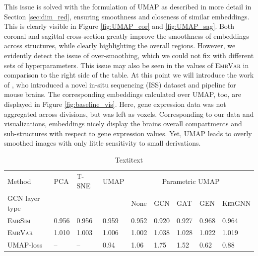 \documentclass[]{article}
\begin{document}
This issue is solved with the formulation of UMAP as described in more detail in Section \ref{sec:dim_red}, ensuring smoothness and closeness of similar embeddings. This is clearly visible in Figure \ref{fig:UMAP_cor} and \ref{fig:UMAP_sag}. Both coronal and sagittal cross-section greatly improve the smoothness of embeddings across structures, while clearly highlighting the overall regions. However, we evidently detect the issue of over-smoothing, which we could not fix with different sets of hyperparameters. This issue may also be seen in the values of \textsc{EmbVar} in comparison to the right side of the table.
At this point we will introduce the work of \citet{Partel2020}, who introduced a novel in-situ sequencing (ISS) dataset and pipeline for mouse brains. The corresponding embeddings calculated over UMAP, too, are displayed in Figure \ref{fig:baseline_vis}. Here, gene expression data was not aggregated across divisions, but was left as voxels. Corresponding to our data and visualizations, embeddings nicely display the brains overall compartments and sub-structures with respect to gene expression values. Yet, UMAP leads to overly smoothed images with only little sensitivity to small derivations. \\


\begin{table}
	\centering
	\renewcommand{\arraystretch}{1.2}
	
	\begin{tabular}{l|l|l|l|l|l|l|l|l}
		Method&PCA&T-SNE&UMAP&\multicolumn{5}{c}{Parametric UMAP}\\
		GCN layer type &&&&None&\textsc{GCN}&\textsc{GAT}&\textsc{GEN}&\textsc{KerGNN}\\
		\hline
		\textsc{EmbSim}&0.956&0.956&0.959&0.952&0.920&0.927&0.968&0.964\\
		
		\textsc{EmbVar}&1.010&1.003&1.006&1.002&1.038&1.028&1.022&1.019\\
		\hline
		UMAP-loss&--&--&0.94&1.06&1.75&1.52&0.62&0.88\\
	\end{tabular}

	\caption{Textitext}
	\label{tab:dim_red_GCN}
\end{table}
\end{document}
